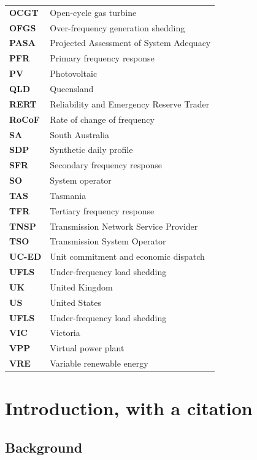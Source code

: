 \documentclass[12pt,a4paper,]{report}
\begin{document}
\begin{longtable}[l]{l l}
\textbf{OCGT} & Open-cycle gas turbine \\
\textbf{OFGS} & Over-frequency generation shedding \\
\textbf{PASA} & Projected Assessment of System Adequacy \\
\textbf{PFR} & Primary frequency response \\
\textbf{PV} & Photovoltaic \\
\textbf{QLD} & Queensland \\
\textbf{RERT} & Reliability and Emergency Reserve Trader \\
\textbf{RoCoF} & Rate of change of frequency \\
\textbf{SA} &  South Australia \\
\textbf{SDP} & Synthetic daily profile \\
\textbf{SFR} & Secondary frequency response \\
\textbf{SO} & System operator \\
\textbf{TAS} & Tasmania \\
\textbf{TFR} & Tertiary frequency response \\
\textbf{TNSP} & Transmission Network Service Provider \\
\textbf{TSO} & Transmission System Operator \\
\textbf{UC-ED} & Unit commitment and economic dispatch \\
\textbf{UFLS} & Under-frequency load shedding \\
\textbf{UK} & United Kingdom \\
\textbf{US} & United States \\
\textbf{UFLS} & Under-frequency load shedding \\
\textbf{VIC} & Victoria \\
\textbf{VPP} & Virtual power plant \\
\textbf{VRE} & Variable renewable energy \\
\end{longtable}

\newpage

\setcounter{page}{1}
\doublespacing
\setlength{\parindent}{0.5in}

\hypertarget{sec:intro}{%
\chapter{Introduction, with a citation}\label{sec:intro}}

\hypertarget{background}{%
\section{Background}\label{background}}
\end{document}
